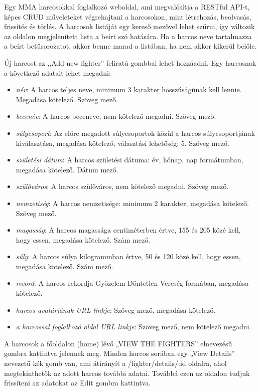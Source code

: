
Egy MMA harcosokkal foglalkozó weboldal, ami megvalósítja a RESTful API-t, képes CRUD műveleteket végrehajtani a harcosokon, mint létrehozás, beolvasás, frissítés és törlés. A harcosok listáját egy kereső mezővel lehet szűrni, így változik az oldalon megjelenített lista a beírt szó hatására. Ha a harcos neve tartalmazza a beírt betűsorozatot, akkor benne marad a listában, ha nem akkor kikerül belőle.

Új harcost az ,,Add new fighter'' feliratú gombbal lehet hozzáadni. Egy harcosnak a következő adatait lehet megadni:

\begin{itemize}
\item \textit{név}: A harcos teljes neve, minimum 3 karakter hosszúságúnak kell lennie. Megadása kötelező. Szöveg mező.
\item \textit{becenév}: A harcos beceneve, nem kötelező megadni. Szöveg mező.
\item \textit{súlycsoport}: Az előre megadott súlycsoportok közül a harcos súlycsoportjának kiválasztása, megadása kötelező, választási lehetőség: 5. Szöveg mező.
\item \textit{születési dátum}: A harcos születési dátuma: év, hónap, nap formátumban, megadása kötelező. Dátum mező.
\item \textit{szülőváros}: A harcos szülőváros, nem kötelező megadni. Szöveg mező.
\item \textit{nemzetiség}: A harcos nemzetisége: minimum 2 karakter, megadása kötelező. Szöveg mező.
\item \textit{magasság}: A harcos magassága centiméterben értve, 155 és 205 közé kell, hogy essen, megadása kötelező. Szám mező.
\item \textit{súly}: A harcos súlya kilogrammban értve, 50 és 120 közé kell, hogy essen, megadása kötelező.  Szám mező.
\item \textit{record}: A harcos rekordja Győzelem-Döntetlen-Vereség formában, megadása kötelező. 
\item \textit{harcos avatárjának URL linkje}: Szöveg mező, megadása kötelező.
\item \textit{a harcossal foglalkozó oldal URL linkje}: Szöveg mező, nem kötelező megadni.
\end{itemize}

A harcosok a főoldalon (home) lévő „VIEW THE FIGHTERS” elnevezésű gombra kattintva jelennek meg. Minden harcos sorában egy „View Details” nevezetű kék gomb van, ami átirányít a /fighter/details/:id oldalra, ahol megtekinthetők az adott harcos további adatai. Továbbá ezen az oldalon tudjuk frissíteni az adatokat az Edit gombra kattintva.


